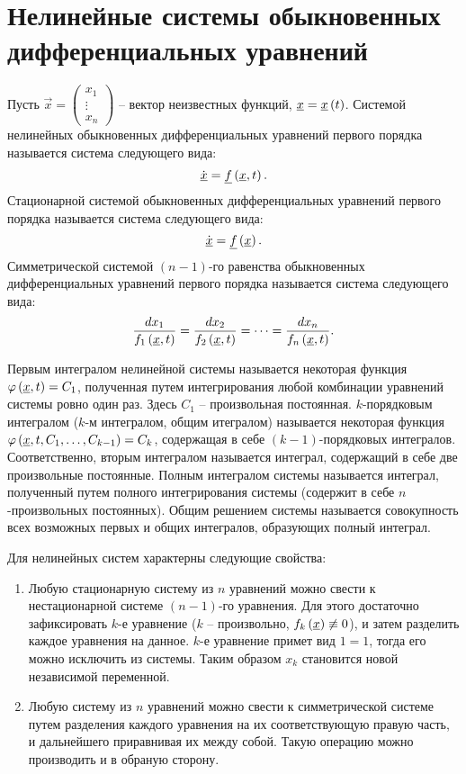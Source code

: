 \section{Нелинейные системы обыкновенных дифференциальных уравнений}

	Пусть \( \vec{x} = \begin{pmatrix} x_1 \\ \vdots \\ x_n \end{pmatrix} \) -- вектор неизвестных функций, $\underline{x} = \underline{x} \left( t \right)$. Системой нелинейных обыкновенных дифференциальных уравнений первого порядка называется система следующего вида:
	\[ \dot{\underline{x}} = \underline{f}\left( \underline{x}, t \right). \]
	Стационарной системой обыкновенных дифференциальных уравнений первого порядка называется система следующего вида:
	\[ \dot{\underline{x}} = \underline{f}\left( \underline{x} \right). \]
	Симметрической системой $(n-1)$-го равенства обыкновенных дифференциальных уравнений первого порядка называется система следующего вида:
	\[ \frac{dx_1}{f_1\left( \underline{x}, t \right)} = \frac{dx_2}{f_2\left( \underline{x}, t \right)} = \dots = \frac{dx_n}{f_n\left( \underline{x}, t \right)}. \]

	Первым интегралом нелинейной системы называется некоторая функция $\varphi\left( \underline{x}, t \right) = C_1$, полученная путем интегрирования любой комбинации уравнений системы ровно один раз. Здесь $C_1$ -- произвольная постоянная. $k$-порядковым интегралом ($k$-м интегралом, общим итегралом) называется некоторая функция $\varphi\left( \underline{x}, t, C_1, \dots, C_{k-1} \right) = C_k$, содержащая в себе $(k-1)$-порядковых интегралов. Соответственно, вторым интегралом называется интеграл, содержащий в себе две произвольные постоянные. Полным интегралом системы называется интеграл, полученный путем полного интегрирования системы (содержит в себе $n$-произвольных постоянных). Общим решением системы называется совокупность всех возможных первых и общих интегралов, образующих полный интеграл.

	Для нелинейных систем характерны следующие свойства:
	\begin{enumerate}
		\item Любую стационарную систему из $n$ уравнений можно свести к нестационарной системе $(n-1)$-го уравнения. Для этого достаточно зафиксировать $k$-е уравнение ($k$ -- произвольно, $f_k \left( \underline{x} \right) \not\equiv 0$), и затем разделить каждое уравнения на данное. $k$-е уравнение примет вид $1 = 1$, тогда его можно исключить из системы. Таким образом $x_k$ становится новой независимой переменной. \label{nls:e1}

		\item Любую систему из $n$ уравнений можно свести к симметрической системе путем разделения каждого уравнения на их соответствующую правую часть, и дальнейшего приравнивая их между собой. Такую операцию можно производить и в обраную сторону. \label{nls:e2}

	\end{enumerate}

